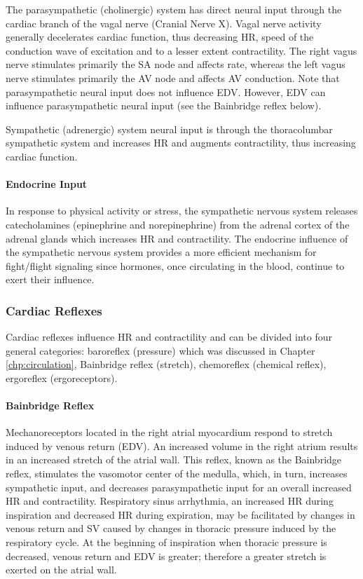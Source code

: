 The parasympathetic (cholinergic) system has direct neural input through the cardiac branch of the vagal nerve (Cranial Nerve X). Vagal nerve activity generally decelerates cardiac function, thus decreasing HR, speed of the conduction wave of excitation and to a lesser extent contractility. The right vagus nerve stimulates primarily the SA node and affects rate, whereas the left vagus nerve stimulates primarily the AV node and affects AV conduction. Note that parasympathetic neural input does not influence EDV. However, EDV can influence parasympathetic neural input (see the Bainbridge reflex below).

Sympathetic (adrenergic) system neural input is through the thoracolumbar sympathetic system and increases HR and augments contractility, thus increasing cardiac function. 

\paragraph{Endocrine Input}
In response to physical activity or stress, the sympathetic nervous system releases catecholamines (epinephrine and norepinephrine) from the adrenal cortex of the adrenal glands which increases HR and contractility. The endocrine influence of the sympathetic nervous system provides a more efficient mechanism for fight/flight signaling since hormones, once circulating in the blood, continue to exert their influence. 

\subsubsection{Cardiac Reflexes}
Cardiac reflexes influence HR and contractility and can be divided into four general categories: baroreflex (pressure) which was discussed in Chapter \ref{chp:circulation}, Bainbridge reflex (stretch), chemoreflex (chemical reflex), ergoreflex (ergoreceptors). 

\paragraph{Bainbridge Reflex}

Mechanoreceptors located in the right atrial myocardium respond to stretch induced by venous return (EDV). An increased volume in the right atrium results in an increased stretch of the atrial wall. This reflex, known as the Bainbridge reflex, stimulates the vasomotor center of the medulla, which, in turn, increases sympathetic input, and decreases parasympathetic input for an overall increased HR and contractility. Respiratory sinus arrhythmia, an increased HR during inspiration and decreased HR during expiration, may be facilitated by changes in venous return and SV caused by changes in thoracic pressure induced by the respiratory cycle. At the beginning of inspiration when thoracic pressure is decreased, venous return and EDV is greater; therefore a greater stretch is exerted on the atrial wall.

